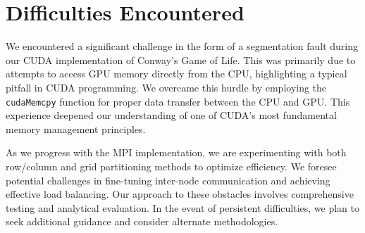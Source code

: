 \documentclass[11pt]{article}
\begin{document}
\section{Difficulties Encountered}

We encountered a significant challenge in the form of a segmentation fault during our CUDA implementation of Conway's Game of Life. This was primarily due to attempts to access GPU memory directly from the CPU, highlighting a typical pitfall in CUDA programming. We overcame this hurdle by employing the \texttt{cudaMemcpy} function for proper data transfer between the CPU and GPU. This experience deepened our understanding of one of CUDA's most fundamental memory management principles.

As we progress with the MPI implementation, we are experimenting with both row/column and grid partitioning methods to optimize efficiency. We foresee potential challenges in fine-tuning inter-node communication and achieving effective load balancing. Our approach to these obstacles involves comprehensive testing and analytical evaluation. In the event of persistent difficulties, we plan to seek additional guidance and consider alternate methodologies.
\end{document}
